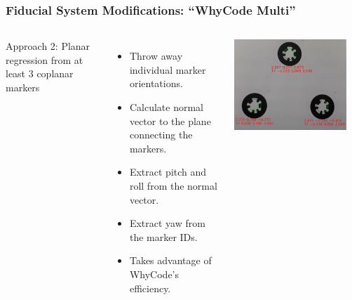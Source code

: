 \documentclass[aspectratio=169]{rubeamer}
\begin{document}
\begin{frame}
  \frametitle{Fiducial System Modifications: ``WhyCode Multi''}

  \begin{columns}
    Approach 2: Planar regression from at least 3 coplanar markers
    \begin{itemize}
      \item Throw away individual marker orientations.
      \item Calculate normal vector to the plane connecting the markers.
      \item Extract pitch and roll from the normal vector.
      \item Extract yaw from the marker IDs.
      \item Takes advantage of WhyCode's efficiency.
    \end{itemize}
    \centering
    \includegraphics[width=0.9\textwidth]{cropped_whycode_3_8_jiri_example}
  \end{columns}
\end{frame}
\end{document}
